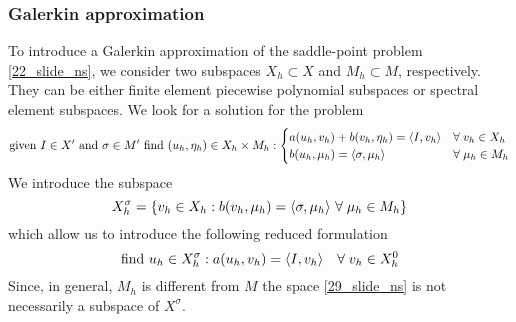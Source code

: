 \subsubsection*{Galerkin approximation}
To introduce a Galerkin approximation of the saddle-point problem \eqref{22_slide_ns}, we consider two subspaces \(X_h \subset X\) and \(M_h \subset M\), respectively. They can be either finite element piecewise polynomial subspaces or spectral element subspaces.
We look for a solution for the problem 
\begin{equation}
    \text{given } I \in X' \text{ and } \sigma \in M' \ \text{find } (u_h, \eta_h) \in X_h \times M_h :
    \begin{cases}
        a(u_h, v_h) + b(v_h, \eta_h) = \langle I,v_h \rangle & \forall \; v_h \in X_h \\
        b(u_h, \mu_h) = \langle \sigma,\mu_h \rangle & \forall \; \mu_h \in M_h
    \end{cases}
    \label{28_slide_ns}
\end{equation}
We introduce the subspace 
\begin{equation}
    X^\sigma_h =\left\{ v_h \in X_h : b(v_h, \mu_h) = \langle \sigma,\mu_h \rangle \ \forall \; \mu_h \in M_h \right\}
    \label{29_slide_ns}
\end{equation}
which allow us to introduce the following reduced formulation 
\begin{equation}
    \text{find } u_h \in X_h^\sigma : a(u_h, v_h) = \langle I,v_h \rangle \quad \forall \; v_h \in X_h^0
    \label{30_slide_ns}
\end{equation}
Since, in general, \(M_h\) is different from \(M\) the space \eqref{29_slide_ns} is not necessarily a subspace of \(X^\sigma\). 

